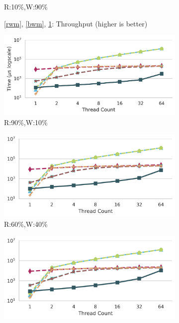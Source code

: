 \begin{figure}[ht]
\begin{subfigure}{.32\textwidth}
		\caption{R:10\%,W:90\%}
		\label{wwm}
	\end{subfigure}
	\begin{subfigure}[b]{\textwidth}
		\caption*{\ref{rwm}, \ref{bwm}, \ref{wwm}: Throughput (higher is better)}
	\end{subfigure}


	\begin{subfigure}[b]{.33\textwidth}
		\includegraphics[width=\textwidth]{figures/PerformanceCharts/ReadWithoutModificationsIdleness}
		\caption{R:90\%,W:10\%}
		\label{irwm}
	\end{subfigure}
	\begin{subfigure}[b]{.32\textwidth}
		\includegraphics[width=\textwidth]{figures/PerformanceCharts/BalancedWithoutModificationsIdleness}
		\caption{R:60\%,W:40\%}
		\label{ibwm}
	\end{subfigure}
	\begin{subfigure}[b]{.32\textwidth}
		\includegraphics[width=\textwidth]{figures/PerformanceCharts/WriteWithoutModificationsIdleness}

\end{subfigure}
\end{figure}
